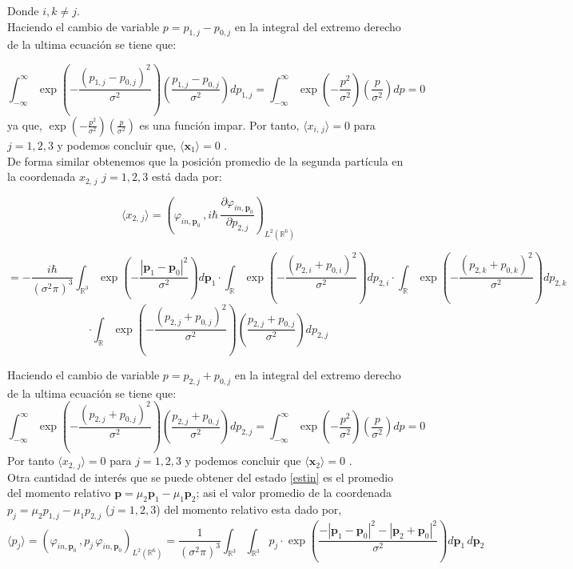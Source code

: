 \documentclass[12pt]{book}
\numberwithin{equation}{chapter}
\def\v{\mathbf}
\def\R{\mathbb{R}}
\def\vp{\varphi}
\def\P{\mathbf{p}}
\begin{document}
Donde $i,k \neq j$.\\

Haciendo el cambio de variable $ p= p_{1,j}-p_{0,j} $ en la integral del extremo derecho de la ultima ecuaci\'on se tiene que:

$$ \int_{-\infty}^{\infty} \exp \left( -\frac{( p_{1,j}-p_{0,j} )^{2}}{\sigma^{2}} \right)  \left( \frac{ p_{1,j}-p_{0,j} }{\sigma^{2}} \right) dp_{1,j} =\int_{-\infty}^{\infty} \exp \left( -\frac{p^{2}}{\sigma^{2}} \right)  \left( \frac{ p }{\sigma^{2}} \right) dp=0 $$
ya que, $\exp \left( -\frac{p^{2}}{\sigma^{2}} \right)  \left( \frac{ p }{\sigma^{2}} \right)$ es una funci\'on impar. Por tanto, $\langle x_{i,\, j} \rangle=0 $ para $j=1,2,3$ y podemos concluir que, $ \langle \v{x}_{1} \rangle=0 $ .\\
De forma similar obtenemos que la posici\'on promedio de la segunda part\'icula en la coordenada $x_{2,\,j}$ $j=1,2,3$ est\'a dada por:

$$ \langle x_{2,\,j} \rangle= \left(\vp_{in,\P_{0} }\, , i\hbar\, \frac{\partial \vp_{in,\P_{0} } }{\partial p_{2,j}}   \right)_{ L^{2}(\R^{6}) } $$

$$ =-\frac{i \hbar}{(\sigma^{2} \pi)^{3}} \int_{\R^{3}} \exp \left( -\frac{|\P_{1}-\P_{0}|^{2}}{\sigma^{2}} \right)  d\P_{1} \cdot \int_{\R} \exp \left( -\frac{( p_{2,i}+p_{0,i} )^{2}}{\sigma^{2}} \right) dp_{2,i} \cdot \int_{\R} \exp \left( -\frac{( p_{2,k}+p_{0,k} )^{2}}{\sigma^{2}} \right) dp_{2,k}  $$
$$ \cdot \int_{\R} \exp \left( -\frac{( p_{2,j}+p_{0,j} )^{2}}{\sigma^{2}} \right)  \left( \frac{ p_{2,j}+p_{0,j} }{\sigma^{2}} \right) dp_{2,j} $$

Haciendo el cambio de variable $p=p_{2,j}+p_{0,j}$ en la integral del extremo derecho de la ultima ecuaci\'on se tiene que:
$$  \int_{-\infty}^{\infty} \exp \left( -\frac{( p_{2,j}+p_{0,j} )^{2}}{\sigma^{2}} \right)  \left( \frac{ p_{2,j}+p_{0,j} }{\sigma^{2}} \right) dp_{2,j} =\int_{-\infty}^{\infty} \exp \left( -\frac{p^{2}}{\sigma^{2}} \right)  \left( \frac{ p }{\sigma^{2}} \right) dp=0 $$
Por tanto $\langle x_{2,\,j} \rangle =0 $ para $j=1,2,3$ y podemos concluir que $\langle \v{x}_{2} \rangle=0 $ .\\

Otra cantidad de inter\'es que se puede obtener del estado \eqref{estin} es el promedio del momento relativo $\P=\mu_{2}\P_{1} - \mu_{1}\P_{2} $; asi el valor promedio de la coordenada $p_{j}= \mu_{2}p_{1,j}-\mu_{1}p_{2,j} $ ($j=1,2,3$) del momento relativo esta dado por,
$$ \langle p_{j} \rangle = \left(\vp_{in,\P_{0} }\, , p_{j}\, \vp_{in,\P_{0} }  \right)_{ L^{2}(\R^{6}) }
=\frac{1}{( \sigma^{2} \pi )^{3}} \int_{\mathbb{R}^{3}} \int_{\mathbb{R}^{3}} p_{j} \cdot \exp \left( \frac{-| \P_{1}-\P_{0} |^{2}-|\P_{2}+\P_{0}|^{2}}{ \sigma^{2} } \right)  d\P_{1}\, d\P_{2}  $$
\end{document}
